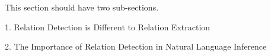 This section should have two sub-sections.

1. Relation Detection is Different to Relation Extraction

2. The Importance of Relation Detection in Natural Language Inference